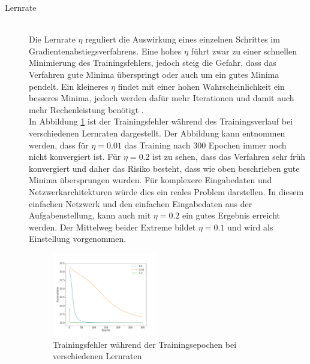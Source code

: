 \begin{description}
	\item[Lernrate]\hfill \\
	Die Lernrate $\eta$ reguliert die Auswirkung eines einzelnen Schrittes im Gradientenabstiegsverfahrens. Eine hohes $\eta$ führt zwar zu einer schnellen Minimierung des Trainingsfehlers, jedoch steig die Gefahr, dass das Verfahren gute Minima überspringt oder auch um ein gutes Minima pendelt. Ein kleineres $\eta$ findet mit einer hohen Wahrscheinlichkeit ein besseres Minima, jedoch werden dafür mehr Iterationen und damit auch mehr Rechenleistung benötigt \cite{neuronalenetze}.\\
	\noindent \hspace*{7mm}
	In Abbildung \ref*{fig:learning_rates} ist der Trainingsfehler während des Trainingsverlauf bei verschiedenen Lernraten dargestellt. Der Abbildung kann entnommen werden, dass für $\eta=0.01$ das Training nach 300 Epochen immer noch nicht konvergiert ist. Für $\eta=0.2$ ist zu sehen, dass das Verfahren sehr früh konvergiert und daher das Risiko besteht, dass wie oben beschrieben gute Minima übersprungen wurden. Für komplexere Eingabedaten und Netzwerkarchitekturen würde dies ein reales Problem darstellen. In diesem einfachen Netzwerk und den einfachen Eingabedaten aus der Aufgabenstellung, kann auch mit $\eta=0.2$ ein gutes Ergebnis erreicht werden. Der Mittelweg beider Extreme bildet $\eta=0.1$ und wird als Einstellung vorgenommen.
	
	\begin{figure}[ht]
		\centering
		\vspace*{-0.9 cm}
		\includegraphics[width = 0.45\textwidth]{Bilder/learning_rates.png}
		\caption{Trainingsfehler während der Trainingsepochen bei verschiedenen Lernraten}
		\label{fig:learning_rates}
	\end{figure}
	

\end{description}
